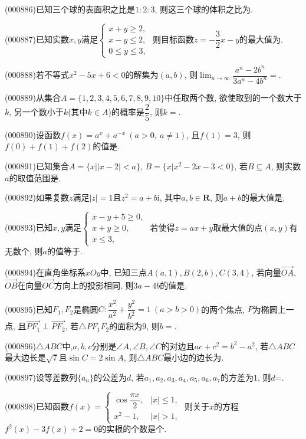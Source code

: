 \item (000886)已知三个球的表面积之比是$1:2:3$, 则这三个球的体积之比为.
\item (000887)已知实数$x,y$满足$\begin{cases}x+y\ge 2, \\ x-y\le 2, \\ 0 \le y\le 3, \end{cases}$ 则目标函数$z=-\dfrac32x-y$的最大值为.
\item (000888)若不等式$x^2-5x+6<0$的解集为$(a,b)$, 则$\displaystyle\lim_{n\to\infty}\dfrac{a^n-2b^n}{3a^n-4b^n}=$.
\item (000889)从集合$A=\{1,2,3,4,5,6,7,8,9,10\}$中任取两个数, 欲使取到的一个数大于$k$, 另一个数小于$k$(其中$k\in A$)的概率是$\dfrac25$, 则$k=$.
\item (000890)设函数$f(x)=a^x+a^{-x}  \ (a>0, \ a\ne 1)$, 且$f(1)=3$, 则$f(0)+f(1)+f(2)$的值是.
\item (000891)已知集合$A=\{x||x-2|<a\}$, $B=\{x|x^2-2x-3<0\}$, 若$B\subseteq A$, 则实数$a$的取值范围是.
\item (000892)如果复数$z$满足$|z|=1$且$z^2=a+b\mathrm{i}$, 其中$a,b\in \mathbf{R}$, 则$a+b$的最大值是.
\item (000893)已知$x,y$满足$\begin{cases}
   x-y+5 \ge 0, \\ x+y\ge 0, \\ x\le 3, \end{cases}$ 若使得$z=ax+y$取最大值的点$(x,y)$有无数个, 则$a$的值等于.
\item (000894)在直角坐标系$xOy$中, 已知三点$A(a,1),B(2,b),C(3,4)$, 若向量$\overrightarrow{OA}$, $\overrightarrow{OB}$在向量$\overrightarrow{OC}$方向上的投影相同, 则$3a-4b$的值是.
\item (000895)已知$F_1,F_2$是椭圆$C:\dfrac{x^2}{a^2}+\dfrac{y^2}{b^2}=1\ (a>b>0)$的两个焦点, $P$为椭圆上一点, 且$\overrightarrow{PF_1}\perp \overrightarrow{PF_2}$, 若$\triangle PF_1F_2$的面积为$9$, 则$b=$.
\item (000896)$\triangle ABC$中,$a,b,c$分别是$\angle A,\angle B,\angle C$的对边且$ac+c^2=b^2-a^2$, 若$\triangle ABC$最大边长是$\sqrt7$且$\sin C=2\sin A$, 则$\triangle ABC$最小边的边长为.
\item (000897)设等差数列$\{a_n\}$的公差为$d$, 若$a_1,a_2,a_3,a_4,a_5,a_6,a_7$的方差为$1$, 则$d$=.
\item (000898)已知函数$f(x)=\begin{cases} \cos \dfrac{\pi x}2, & |x|\le 1,  \\ x^2-1, & |x|>1,  \end{cases}$ 则关于$x$的方程$f^2(x)-3f(x)+2=0$的实根的个数是个.
